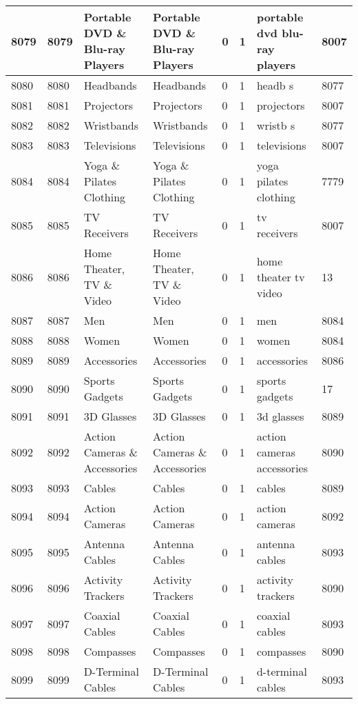 \begin{longtable}{|l|l|l|l|l|l|l|l|}
8079 & 8079 & Portable DVD \& Blu-ray Players & Portable DVD \& Blu-ray Players & 0 & 1 & portable dvd blu-ray players & 8007 \\ \hline 
8080 & 8080 & Headbands & Headbands & 0 & 1 & headb s & 8077 \\ \hline 
8081 & 8081 & Projectors & Projectors & 0 & 1 & projectors & 8007 \\ \hline 
8082 & 8082 & Wristbands & Wristbands & 0 & 1 & wristb s & 8077 \\ \hline 
8083 & 8083 & Televisions & Televisions & 0 & 1 & televisions & 8007 \\ \hline 
8084 & 8084 & Yoga \& Pilates Clothing & Yoga \& Pilates Clothing & 0 & 1 & yoga pilates clothing & 7779 \\ \hline 
8085 & 8085 & TV Receivers & TV Receivers & 0 & 1 & tv receivers & 8007 \\ \hline 
8086 & 8086 & Home Theater, TV \& Video & Home Theater, TV \& Video & 0 & 1 & home theater tv video & 13 \\ \hline 
8087 & 8087 & Men & Men & 0 & 1 & men & 8084 \\ \hline 
8088 & 8088 & Women & Women & 0 & 1 & women & 8084 \\ \hline 
8089 & 8089 & Accessories & Accessories & 0 & 1 & accessories & 8086 \\ \hline 
8090 & 8090 & Sports Gadgets & Sports Gadgets & 0 & 1 & sports gadgets & 17 \\ \hline 
8091 & 8091 & 3D Glasses & 3D Glasses & 0 & 1 & 3d glasses & 8089 \\ \hline 
8092 & 8092 & Action Cameras \& Accessories & Action Cameras \& Accessories & 0 & 1 & action cameras accessories & 8090 \\ \hline 
8093 & 8093 & Cables & Cables & 0 & 1 & cables & 8089 \\ \hline 
8094 & 8094 & Action Cameras & Action Cameras & 0 & 1 & action cameras & 8092 \\ \hline 
8095 & 8095 & Antenna Cables & Antenna Cables & 0 & 1 & antenna cables & 8093 \\ \hline 
8096 & 8096 & Activity Trackers & Activity Trackers & 0 & 1 & activity trackers & 8090 \\ \hline 
8097 & 8097 & Coaxial Cables & Coaxial Cables & 0 & 1 & coaxial cables & 8093 \\ \hline 
8098 & 8098 & Compasses & Compasses & 0 & 1 & compasses & 8090 \\ \hline 
8099 & 8099 & D-Terminal Cables & D-Terminal Cables & 0 & 1 & d-terminal cables & 8093 \\ \hline 

\end{longtable}
